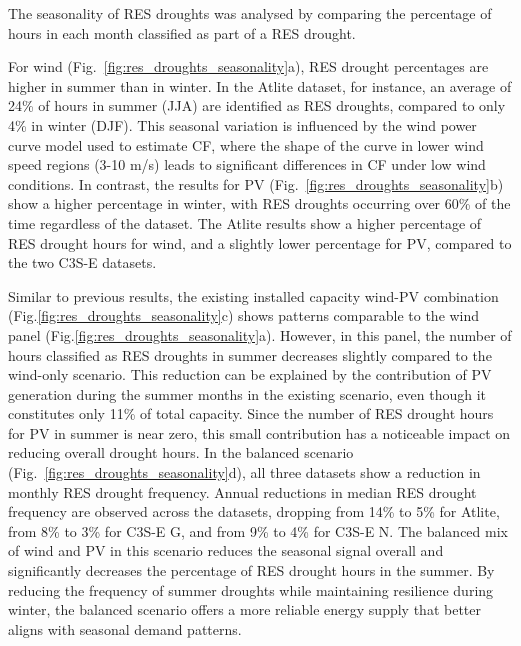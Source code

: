 \documentclass[a4paper, 11pt]{article}
\begin{document}
The seasonality of RES droughts was analysed by comparing the percentage of hours in each month classified as part of a RES drought. 

For wind (Fig.~\ref{fig:res_droughts_seasonality}a), RES drought percentages are higher in summer than in winter. In the Atlite dataset, for instance, an average of 24\% of hours in summer (JJA) are identified as RES droughts, compared to only 4\% in winter (DJF). This seasonal variation is influenced by the wind power curve model used to estimate CF, where the shape of the curve in lower wind speed regions (3-10 m/s) leads to significant differences in CF under low wind conditions. In contrast, the results for PV (Fig.~\ref{fig:res_droughts_seasonality}b) show a higher percentage in winter, with RES droughts occurring over 60\% of the time regardless of the dataset. The Atlite results show a higher percentage of RES drought hours for wind, and a slightly lower percentage for PV, compared to the two C3S-E datasets. 

Similar to previous results, the existing installed capacity wind-PV combination (Fig.\ref{fig:res_droughts_seasonality}c) shows patterns comparable to the wind panel (Fig.\ref{fig:res_droughts_seasonality}a). However, in this panel, the number of hours classified as RES droughts in summer decreases slightly compared to the wind-only scenario. This reduction can be explained by the contribution of PV generation during the summer months in the existing scenario, even though it constitutes only 11\% of total capacity. Since the number of RES drought hours for PV in summer is near zero, this small contribution has a noticeable impact on reducing overall drought hours. In the balanced scenario (Fig.~\ref{fig:res_droughts_seasonality}d), all three datasets show a reduction in monthly RES drought frequency. Annual reductions in median RES drought frequency are observed across the datasets, dropping from 14\% to 5\% for Atlite, from 8\% to 3\% for C3S-E G, and from 9\% to 4\% for C3S-E N. The balanced mix of wind and PV in this scenario reduces the seasonal signal overall and significantly decreases the percentage of RES drought hours in the summer. By reducing the frequency of summer droughts while maintaining resilience during winter, the balanced scenario offers a more reliable energy supply that better aligns with seasonal demand patterns.
\end{document}
